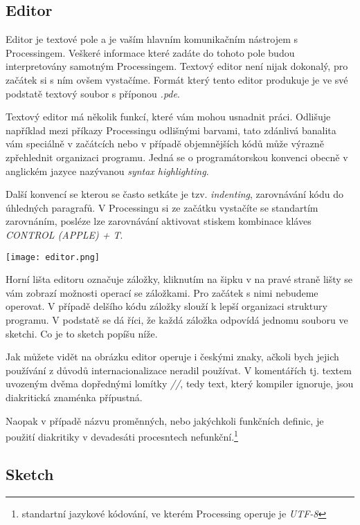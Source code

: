\documentclass[11pt]{article}
\begin{document}
\subsection{Editor}

Editor je textové pole a je vaším hlavním komunikačním nástrojem s Processingem. Veškeré informace které zadáte do tohoto pole budou interpretovány samotným Processingem. Textový editor není nijak dokonalý, pro začátek si s ním ovšem vystačíme. Formát který tento editor produkuje je ve své podstatě textový soubor s příponou {\em *.pde}.

Textový editor má několik funkcí, které vám mohou usnadnit práci. Odlišuje například mezi příkazy Processingu odlišnými barvami, tato zdánlivá banalita vám speciálně v začátcích nebo v případě objemnějších kódů může výrazně zpřehlednit organizaci programu. Jedná se o programátorskou konvenci obecně v anglickém jazyce nazývanou {\em syntax highlighting}.

Další konvencí se kterou se často setkáte je tzv. {\em indenting}, zarovnávání kódu do úhledných paragrafů. V Processingu si ze začátku vystačíte se standartím zarovnáním, posléze lze zarovnávání aktivovat stiskem kombinace kláves {\em CONTROL (APPLE) + T}.\\


\begin{center}
\texttt{[image: editor.png]}
\end{center}

Horní lišta editoru označuje záložky, kliknutím na šipku v na pravé straně lišty se vám zobrazí možnosti operací se záložkami. Pro začátek s nimi nebudeme operovat. V případě delšího kódu záložky slouží k lepší organizaci struktury programu. V podstatě se dá říci, že každá záložka odpovídá jednomu souboru ve sketchi. Co je to sketch popíšu níže.

Jak můžete vidět na obrázku editor operuje i českými znaky, ačkoli bych jejich používání z důvodů internacionalizace neradil používat. V komentářích tj. textem uvozeným dvěma dopřednými lomítky {\em //}, tedy text, který kompiler ignoruje, jsou diakritická znaménka přípustná.

Naopak v případě názvu proměnných, nebo jakýchkoli funkčních definic, je použití diakritiky v devadesáti procesntech nefunkční.\footnote{standartní jazykové kódování, ve kterém Processing operuje je {\em UTF-8}}

\subsection{Sketch}
\end{document}
